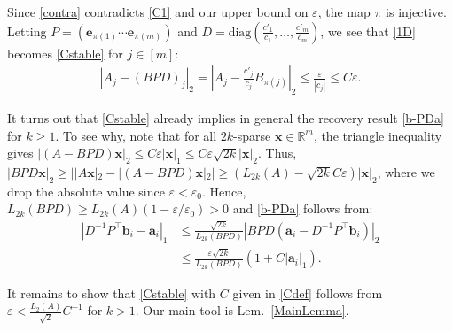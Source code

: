 \documentclass[journal, twocolumn]{IEEEtran}
\begin{document}
Since \eqref{contra} contradicts \eqref{C1} and our upper bound on $\varepsilon$, the map $\pi$ is injective. Letting $P = \left( \mathbf{e}_{\pi(1)} \cdots \mathbf{e}_{\pi(m)}\right)$ and $D = \text{diag}(\frac{c'_1}{c_1},\ldots,\frac{c'_m}{c_m})$, we see that \eqref{1D} becomes \eqref{Cstable} for $j \in [m]$:
\begin{align*}%
|A_j - (BPD)_j|_2 = |A_j - \frac{c'_j}{c_j}B_{\pi(j)}|_2 \leq \frac{\varepsilon}{|c_j|} \leq C\varepsilon.
\end{align*}


It turns out that \eqref{Cstable} already implies in general the recovery result \eqref{b-PDa} for $k \geq 1$. To see why, note that for all $2k$-sparse $\mathbf{x} \in \mathbb{R}^m$, the triangle inequality gives \mbox{$|(A-BPD)\mathbf{x}|_2  \leq C\varepsilon|\mathbf{x}|_1 \leq C \varepsilon \sqrt{2k}  |\mathbf{x}|_2$}. Thus, $|BPD\mathbf{x}|_2 \geq | |A\mathbf{x}|_2 - |(A-BPD)\mathbf{x}|_2 | \geq (L_{2k}(A) - \sqrt{2k}C\varepsilon ) |\mathbf{x}|_2$, where we drop the absolute value since $\varepsilon < \varepsilon_0$. Hence, $L_{2k}(BPD) \geq L_{2k}(A)\left( 1 - \varepsilon/\varepsilon_0 \right) > 0$ and \eqref{b-PDa} follows from:
\begin{align*}
|D^{-1}P^{\top}\mathbf{b}_i - \mathbf{a}_i|_1
&\leq \frac{\sqrt{2k}}{L_{2k}(BPD)}|BPD(\mathbf{a}_i - D^{-1}P^{\top}\mathbf{b}_i)|_2 \\
&\leq \frac{\varepsilon\sqrt{2k}}{L_{2k}(BPD)}(1+C|\mathbf{a}_i|_1).
\end{align*}

It remains to show that \eqref{Cstable} with $C$ given in \eqref{Cdef} follows from $\varepsilon < \frac{L_2(A)}{\sqrt{2}}C^{-1}$ for $k > 1$. Our main tool is Lem.~\ref{MainLemma}.
\end{document}
